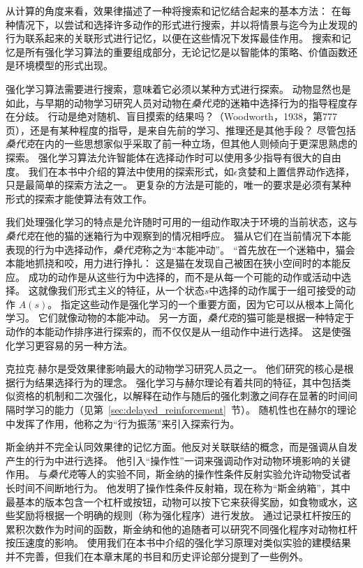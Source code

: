 从计算的角度来看，效果律描述了一种将搜索和记忆结合起来的基本方法：
在每种情况下，以尝试和选择许多动作的形式进行搜索，并以将情景与迄今为止发现的行为联系起来的关联形式进行记忆，以便在这些情况下发挥最佳作用。
搜索和记忆是所有强化学习算法的重要组成部分，无论记忆是以智能体的策略、价值函数还是环境模型的形式出现。


强化学习算法需要进行搜索，意味着它必须以某种方式进行探索。
动物显然也是如此，与早期的动物学习研究人员对动物在\textit{桑代克}的迷箱中选择行为的指导程度存在分歧。
行动是绝对随机、盲目摸索的结果吗？（Woodworth，1938，第777页），还是有某种程度的指导，是来自先前的学习、推理还是其他手段？
尽管包括\textit{桑代克}在内的一些思想家似乎采取了前一种立场，但其他人则倾向于更深思熟虑的探索。
强化学习算法允许智能体在选择动作时可以使用多少指导有很大的自由度。
我们在本书中介绍的算法中使用的探索形式，如$\epsilon$贪婪和上置信界动作选择，只是最简单的探索方法之一。
更复杂的方法是可能的，唯一的要求是必须有某种形式的探索才能使算法有效工作。



我们处理强化学习的特点是允许随时可用的一组动作取决于环境的当前状态，这与\textit{桑代克}在他的猫的迷箱行为中观察到的情况相呼应。
猫从它们在当前情况下本能表现的行为中选择动作，\textit{桑代克}称之为“本能冲动”。
“首先放在一个迷箱中，猫会本能地抓挠和咬，用力进行挣扎：
这是猫在发现自己被困在狭小空间时的本能反应。
成功的动作是从这些行为中选择的，而不是从每一个可能的动作或活动中选择。
这就像我们形式主义的特征，从一个状态$ s $中选择的动作属于一组可接受的动作 $ A(s) $。
指定这些动作是强化学习的一个重要方面，因为它可以从根本上简化学习。
它们就像动物的本能冲动。
另一方面，\textit{桑代克}的猫可能是根据一种特定于动作的本能动作排序进行探索的，而不仅仅是从一组动作中进行选择。
这是使强化学习更容易的另一种方法。


克拉克$\cdot$赫尔\cite{skinner2019behavior}是受效果律影响最大的动物学习研究人员之一。
他们研究的核心是根据行为结果选择行为的理念。
强化学习与赫尔理论有着共同的特征，其中包括类似资格的机制和二次强化，以解释在动作与随后的强化刺激之间存在显著的时间间隔时学习的能力（见第~\ref{sec:delayed_reinforcement}~节）。
随机性也在赫尔的理论中发挥了作用，他称之为“行为振荡”来引入探索行为。


斯金纳并不完全认同效果律的记忆方面。他反对关联联结的概念，而是强调从自发产生的行为中进行选择。
他引入“操作性”一词来强调动作对动物环境影响的关键作用。
与\textit{桑代克}等人的实验不同，斯金纳的操作性条件反射实验允许动物受试者长时间不间断地行为。
他发明了操作性条件反射箱，现在称为“斯金纳箱”，其中最基本的版本包含一个杠杆或按钮，动物可以按下它来获得奖励，如食物或水，这些奖励将根据一个明确的规则（称为强化程序）进行发放。
通过记录杠杆按压的累积次数作为时间的函数，斯金纳和他的追随者可以研究不同强化程序对动物杠杆按压速度的影响。
使用我们在本书中介绍的强化学习原理对类似实验的建模结果并不完善，但我们在本章末尾的书目和历史评论部分提到了一些例外。


